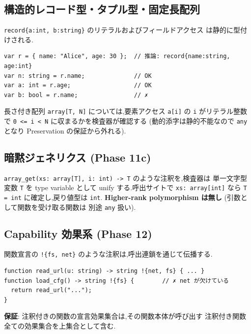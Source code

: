 \documentclass[11pt,a4paper]{article}
\newcommand{\code}[1]{\texttt{\small #1}}
\begin{document}
\subsection{構造的レコード型・タプル型・固定長配列}

\code{record\{a:int, b:string\}} のリテラルおよびフィールドアクセス
は静的に型付けされる.

\begin{lstlisting}
var r = { name: "Alice", age: 30 };  // 推論: record{name:string, age:int}
var n: string = r.name;              // OK
var a: int = r.age;                  // OK
var b: bool = r.name;                // ✗
\end{lstlisting}

長さ付き配列 \code{array[T, N]} については,要素アクセス \code{a[i]} の
\code{i} がリテラル整数で \code{0 <= i < N} に収まるかを検査器が確認する
(動的添字は静的不能なので \code{any} となり Preservation の保証から外れる).

\subsection{暗黙ジェネリクス (Phase 11c)}

\code{array\_get(xs: array[T], i: int) -> T} のような注釈を,検査器は
単一文字型変数 \code{T} を type variable として unify する.呼出サイトで
\code{xs: array[int]} なら \code{T = int} に確定し,戻り値型は \code{int}.
\textbf{Higher-rank polymorphism は無し} (引数として関数を受け取る関数は
別途 \code{any} 扱い).

\subsection{Capability 効果系 (Phase 12)}

関数宣言の \code{!\{fs, net\}} のような注釈は,呼出連鎖を通じて伝播する.

\begin{lstlisting}
function read_url(u: string) -> string !{net, fs} { ... }
function load_cfg() -> string !{fs} {        // ✗ net が欠けている
  return read_url("...");
}
\end{lstlisting}

\textbf{保証}: 注釈付きの関数の宣言効果集合は,その関数本体が呼び出す
注釈付き関数全ての効果集合を上集合として含む.
\end{document}
